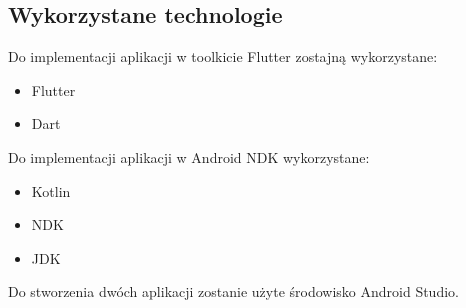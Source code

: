\documentclass[12pt,a4paper]{article}
\begin{document}
\subsection{Wykorzystane technologie}
Do implementacji aplikacji w toolkicie Flutter zostajną wykorzystane:
\begin{itemize}
    \item Flutter
    \item Dart
\end{itemize}

Do implementacji aplikacji w Android NDK wykorzystane:
\begin{itemize}
    \item Kotlin
    \item NDK
    \item JDK
\end{itemize}

Do stworzenia dwóch aplikacji zostanie użyte środowisko Android Studio.
\end{document}
